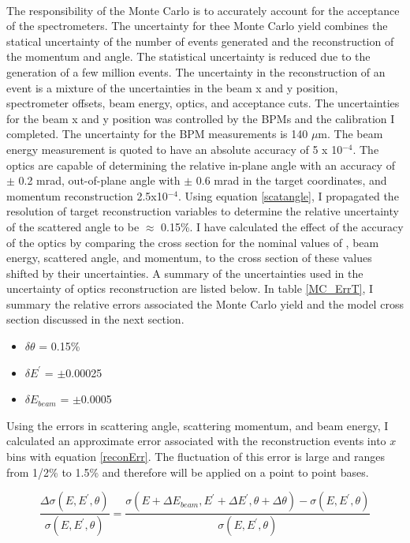 \paragraph{}The responsibility of the Monte Carlo is to accurately account for the acceptance of the spectrometers. The uncertainty for thee Monte Carlo yield combines the statical uncertainty of the number of events generated and the reconstruction of the momentum and angle.  The statistical uncertainty is reduced due to the generation of a few million events. The uncertainty in the reconstruction of an event is a mixture of the uncertainties in the beam x and y position, spectrometer offsets, beam energy, optics, and acceptance cuts. The uncertainties for the beam x and y position was controlled by the BPMs and the calibration I completed. The uncertainty for the BPM measurements is 140 $\mu$m. The beam energy measurement is quoted to have an absolute accuracy of 5 x 10$^{-4}$.  The optics are capable of determining the relative in-plane angle with an accuracy of $\pm$ 0.2 mrad, out-of-plane angle with $\pm$ 0.6 mrad in the target coordinates, and momentum reconstruction 2.5x10$^{-4}$\cite{HallA}.  Using equation \ref{scatangle}, I propagated the resolution of target reconstruction variables to determine the relative uncertainty of the scattered angle to be $\approx$ 0.15\%. I have calculated the effect of the accuracy of the optics by comparing the cross section for the nominal values of , beam energy, scattered angle, and momentum, to the cross section of these values shifted by their uncertainties. A summary of the uncertainties used in the uncertainty of optics reconstruction are listed below. In table \ref{MC_ErrT}, I summary the relative errors associated the Monte Carlo yield and the model cross section discussed in the next section. 
\begin{itemize}
\item$\delta \theta$ = 0.15\%
\item$\delta E^{\prime}$ = $\pm$0.00025
\item$\delta E_{beam}$ = $\pm$0.0005
\end{itemize}
Using the errors in scattering angle, scattering momentum, and beam energy, I calculated an approximate error associated with the reconstruction events into $x$ bins with equation \ref{reconErr}. The fluctuation of this error is large and ranges from 1/2\% to 1.5\% and therefore will be applied on a point to point bases. 

\begin{equation}
\frac{\Delta \sigma(E,E^{\prime},\theta)}{ \sigma(E,E^{\prime},\theta)} = \frac{\sigma(E+\Delta E_{beam},E^{\prime}+\Delta E^{\prime},\theta+\Delta \theta) - \sigma(E,E^{\prime},\theta)}{\sigma(E,E^{\prime},\theta)} \label{reconErr}
\end{equation}

